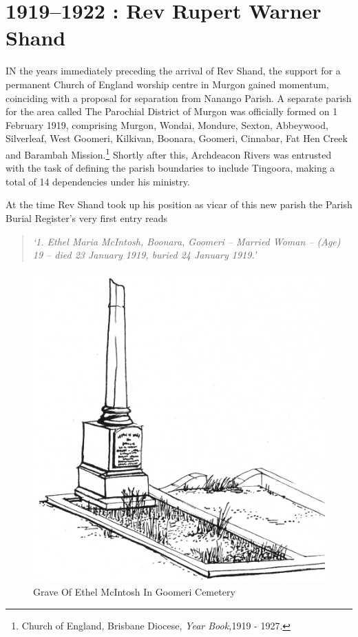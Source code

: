 \balance


\printendnotes[custom]
\setcounter{endnote}{0}
\chapter{1919--1922 : Rev Rupert Warner Shand}
\nobalance


\lettrine[lines=3]{I}{N}
 the years immediately preceding the arrival of Rev Shand, the support for a permanent Church of England worship centre in Murgon gained momentum, coinciding with a proposal for separation from Nanango Parish. A separate parish for the area called The Parochial District of Murgon was officially formed on 1 February 1919, comprising Murgon, Wondai, Mondure, Sexton, Abbeywood, Silverleaf, West Goomeri, Kilkivan, Boonara, Goomeri, Cinnabar, Fat Hen Creek and Barambah Mission.\footnote{Church of England, Brisbane Diocese, \emph{Year Book,}1919 - 1927.} Shortly after this, Archdeacon Rivers was entrusted with the task of defining the parish boundaries to include Tingoora, making a total of 14 dependencies under his ministry.

At the time Rev Shand took up his position as vicar of this new parish the Parish Burial Register's very first entry reads



\begin{quote}

\emph{`1. Ethel Maria McIntosh, Boonara, Goomeri -- Married Woman -- (Age) 19 -- died 23 January 1919, buried 24 January 1919.'}

\end{quote}









\begin{figure}
\begin{center}
\includegraphics[width=.7\linewidth,center]{../images/graveOfEthelMcIntoshInGoomeriCemetery.jpg}
\caption{Grave Of Ethel McIntosh In Goomeri Cemetery}
\end{center}
\end{figure}




